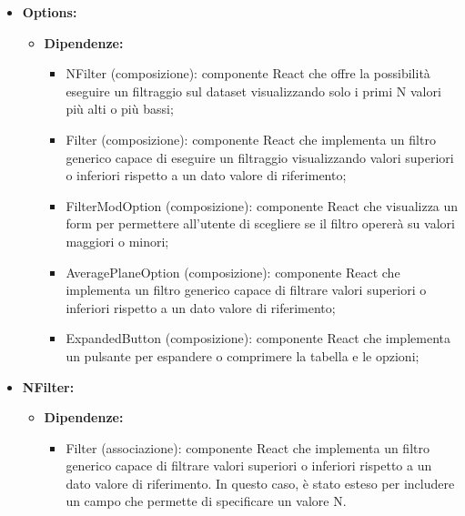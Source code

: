 \begin{itemize}
      \item \textbf{Options:}
            \begin{itemize}
                  \item \textbf{Dipendenze:}
                        \begin{itemize}
                              \item NFilter (composizione): componente React che offre la possibilità eseguire un
                                    filtraggio sul dataset visualizzando solo i primi N valori più alti o più
                                    bassi;
                              \item Filter (composizione): componente React che implementa un filtro generico
                                    capace di eseguire un filtraggio visualizzando valori superiori o inferiori
                                    rispetto a un dato valore di riferimento;
                              \item FilterModOption (composizione): componente React che visualizza un form per
                                    permettere all'utente di scegliere se il filtro opererà su valori maggiori o
                                    minori;
                              \item AveragePlaneOption (composizione): componente React che implementa un filtro
                                    generico capace di filtrare valori superiori o inferiori rispetto a un dato
                                    valore di riferimento;
                              \item ExpandedButton (composizione): componente React che implementa un pulsante per
                                    espandere o comprimere la tabella e le opzioni;
                        \end{itemize}
            \end{itemize}
      \item \textbf{NFilter:}
            \begin{itemize}
                  \item \textbf{Dipendenze:}
                        \begin{itemize}
                              \item Filter (associazione): componente React che implementa un filtro generico
                                    capace di filtrare valori superiori o inferiori rispetto a un dato valore di
                                    riferimento. In questo caso, è stato esteso per includere un campo che permette
                                    di specificare un valore N.
                        \end{itemize}
            \end{itemize}
\end{itemize}


